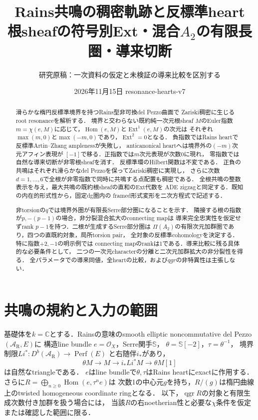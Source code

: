 \documentclass[11pt,a4paper]{ltjsarticle}
\title{Rains共鳴の稠密軌跡と反標準heart\\
\large 根sheafの符号別Ext・混合$A_2$の有限長圏・導来切断}
\author{研究原稿：一次資料の仮定と未検証の導来比較を区別する}
\date{2026年11月15日 \quad resonance-hearts-v7}
\theoremstyle{definition}\newtheorem{remark}[theorem]{注意}
\DeclareMathOperator{\Hom}{Hom}
\DeclareMathOperator{\Ext}{Ext}
\DeclareMathOperator{\Perf}{Perf}
\DeclareMathOperator{\qgr}{qgr}
\newcommand{\Db}{D^b}
\begin{document}
\maketitle
\begin{abstract}
滑らかな楕円反標準境界を持つRains型非可換del Pezzo曲面で
Zariski稠密に生じるroot resonanceを解析する．
境界と交わらない既約純一次元根sheaf $M$のEuler指数
$m=\chi(e,M)$に応じて，$\Hom(e,M)$と$\Ext^1(e,M)$の次元は
それぞれ$\max(m,0)$と$\max(-m,0)$であり，$\Ext^2=0$となる．
負指数ではRains heartで反標準Artin--Zhang amplenessが失敗し，
anticanonical heartへは境界外の$(-m)$次元アフィン表現が
$[-1]$で移る．正指数では$m$次元表現が次数0に現れ，
零指数では自然な導来切断が非零根sheafを消す．
反標準環のHilbert関数は不変である．
正負の共鳴はそれぞれ滑らかなdel Pezzoを保ってZariski稠密に実現し，
さらに次数$d=1,\ldots,6$で全根が非零指数で同時に共鳴する点配置も稠密である．
全根共鳴の整数表示を与え，最大共鳴の既約根sheafの直和のExt代数を
ADE zigzagと同定する．既知の内在的形式性から，固定dg圏内の
framed形式変形を二次方程式で記述する．

非torsionの$q$では境界外圏が有限長Serre部分圏になることを示す．
隣接する根の指数が$p,-(p-1)$の場合，非分裂混合拡大のconnecting mapは
導来完全忠実性を仮定せずrank $p-1$を持つ．二根が生成するSerre部分圏は
$\Pi(A_2)$の有限次元加群圏であり，四つの直既約対象，局所torsion pair，
全対象の反標準cohomologyを決定する．特に指数$+2,-1$の明示例では
connecting mapのrankは1である．導来比較に残る具体的な必要条件として，
二つの一次元characterの分離と二次元加群拡大の非分裂性を得る．
全パラメータでの導来同値，全heartの比較，および$qgr$の非特異性は主張しない．
\end{abstract}

\section{共鳴の規約と入力の範囲}
基礎体を$k=\mathbb C$とする．Rainsの意味のsmooth elliptic
noncommutative del Pezzo $(\mathcal A_{\mathrm R},E)$に
構造line bundle $e=\mathcal O_X$，Serre関手$\mathbb S$，
$\theta=\mathbb S[-2]$，$\tau=\theta^{-1}$，
境界制限$Li^*:\Db(\mathcal A_{\mathrm R})\to\Perf(E)$
と右随伴$i_*$があり，
\begin{equation}\label{eq:boundarytriangle}
 \theta M\longrightarrow M\longrightarrow i_*Li^*M
 \longrightarrow\theta M[1]
\end{equation}
は自然なtriangleである\cite[\S\S4--5]{RainsFiltered}．
$e$はline bundleで$\theta,\tau$はRains heartにexactに作用する．
さらに$R=\bigoplus_{n\ge0}\Hom(e,\tau^ne)$は
次数1の中心元$g$を持ち，$R/(g)$は楕円曲線上のtwisted
homogeneous coordinate ringとなる\cite[Proposition 5.1]{RainsFiltered}．
以下，$\qgr R$の対象と有限生成次数付き加群を扱う場合には，
当該$R$の右noetherian性と必要な$\chi$条件を仮定または確認した範囲に限る．
\end{document}
